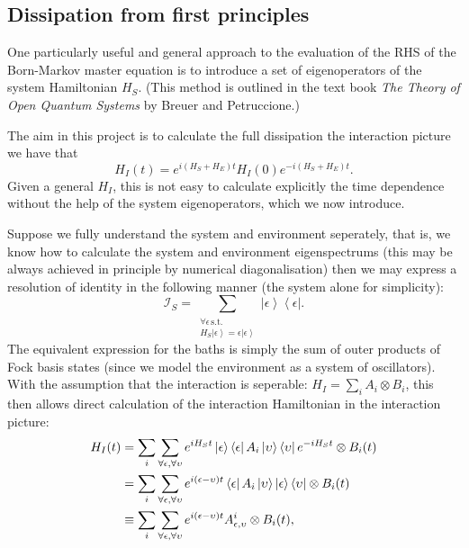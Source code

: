\documentclass[11pt,a4paper,article,oneside]{memoir}
\newcommand{\bra}[1]{\left\langle #1\right|}
\newcommand{\ket}[1]{\left| #1\right\rangle}
\newcommand{\outr}[2]{\left| #1\right\rangle\left\langle #2\right|}
\begin{document}
\subsection{Dissipation from first principles}
\par One particularly useful and general approach to the evaluation of
the RHS of the Born-Markov master equation is to introduce a set of
eigenoperators of the system Hamiltonian $H_S$. (This method is
outlined in the text book \textit{The Theory of Open Quantum Systems}
by Breuer and Petruccione.) \par The aim in this project is to
calculate the full dissipation the interaction picture we have that
\begin{equation}
	H_I(t) = e^{i(H_S+H_E)t}H_I(0)e^{-i(H_S+H_E)t}.
\end{equation}
Given a general $H_I$, this is not easy to calculate explicitly the
time dependence without the help of the system eigenoperators, which
we now introduce.  \par Suppose we fully understand the system and
environment seperately, that is, we know how to calculate the system
and environment eigenspectrums (this may be always achieved in
principle by numerical diagonalisation) then we may express a
resolution of identity in the following manner (the system alone for
simplicity):
\begin{equation}
\mathcal{I}_S=\sum_{\substack{\forall \epsilon\,\text{s.t.}
    \\ H_S\ket{\epsilon}=\epsilon\ket{\epsilon}}}\outr{\epsilon}{\epsilon}.
\end{equation}
The equivalent expression for the baths is simply the sum of outer
products of Fock basis states (since we model the environment as a
system of oscillators). With the assumption that the interaction is
seperable: $H_I = \sum_i A_i \otimes B_i$, this then allows direct
calculation of the interaction Hamiltonian in the interaction picture:
\begin{align}
H_I(t) &= \sum_i \sum_{\forall\epsilon,\forall\upsilon}
e^{iH_St}\outr{\epsilon}{\epsilon}A_i\outr{\upsilon}{\upsilon}e^{-iH_St}\otimes
B_i(t) \notag \\ &= \sum_i
\sum_{\forall\epsilon,\forall\upsilon}e^{i(\epsilon-\upsilon)t}\bra{\epsilon}A_i\ket{\upsilon}
\outr{\epsilon}{\upsilon}\otimes B_i(t) \notag
\\ &\equiv\sum_i\sum_{\forall\epsilon,\forall\upsilon}e^{i(\epsilon-\upsilon)t}A^i_{\epsilon,\upsilon}\otimes
B_i(t),
\end{align}
\end{document}
